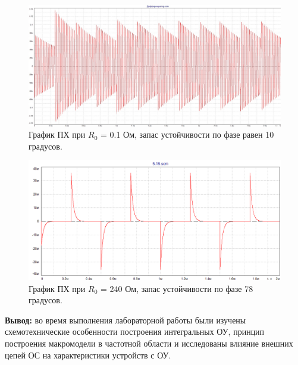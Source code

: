 \documentclass[a4paper,14pt]{extarticle}
\begin{document}
    \begin{figure}[h!]
        \begin{center}
            \includegraphics[scale=0.3]{30.jpeg}
        \end{center}
        \vspace{-0.7cm}
        \caption{График ПХ при $R_0$ = 0.1 Ом, запас устойчивости по фазе равен 10 градусов.}
    \end{figure}

    \begin{figure}[h!]
        \begin{center}
            \includegraphics[scale=0.5]{31.png}
        \end{center}
        \vspace{-0.7cm}
        \caption{График ПХ при $R_0$ = 240 Ом, запас устойчивости по фазе 78 градусов.}
    \end{figure}

    \textbf{Вывод:} во время выполнения лабораторной работы были изучены 
    схемотехнические особенности построения интегральных ОУ, принцип 
    построения макромодели в частотной области и исследованы влияние 
    внешних цепей ОС на характеристики устройств с ОУ. 
\end{document}

